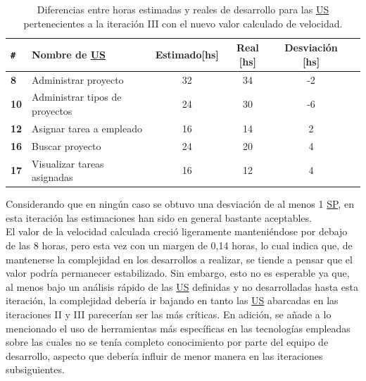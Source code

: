 \documentclass[a4paper, 12pt,twoside]{report}  %
\numberwithin{equation}{subsection} %
\begin{document}
\begin{table}[h!]
	\centering
	\captionsetup{justification=centering,margin=1.5cm}
	\begin{tabular}{ |p{0.5cm}|l|c|c|c|c| }
		\hline
		\verb|#|& \textbf{Nombre de \hyperlink{US}{US}}& \textbf{Estimado[hs]} & \textbf{Real [hs]} & \textbf{Desviación [hs]} \\
		\hline
		\textbf{8} & Administrar proyecto & 32 & 34 & \cellcolor{diferencia_estimacion_negativa}-2 \\
		\hline
		\textbf{10} & Administrar tipos de proyectos & 24 & 30 & \cellcolor{diferencia_estimacion_negativa}-6 \\
		\hline
		\textbf{12} & Asignar tarea a empleado & 16 & 14 & \cellcolor{diferencia_estimacion_positiva}2 \\
		\hline
		\textbf{16} & Buscar proyecto & 24 & 20 & \cellcolor{diferencia_estimacion_positiva}4 \\
		\hline
		\textbf{17} & Visualizar tareas asignadas & 16 & 12 & \cellcolor{diferencia_estimacion_positiva}4 \\
		\hline
	\end{tabular}
	\caption{Diferencias entre horas estimadas y reales de desarrollo para las \protect\hyperlink{US}{US} pertenecientes a la iteración III con el nuevo valor calculado de velocidad.}
	\label{tabla_dif_horas_estim_iter_3}
\end{table}

\indent Considerando que en ningún caso se obtuvo una desviación de al menos 1 \hyperlink{SP}{SP}, en esta iteración las estimaciones han sido en general bastante aceptables.\\
\indent El valor de la velocidad calculada creció ligeramente manteniéndose por debajo de las 8 horas, pero esta vez con un margen de 0,14 horas, lo cual indica que, de mantenerse la complejidad en los desarrollos a realizar, se tiende a pensar que el valor podría permanecer estabilizado. Sin embargo, esto no es esperable ya que, al menos bajo un análisis rápido de las \hyperlink{US}{US} definidas y no desarrolladas hasta esta iteración, la complejidad debería ir bajando en tanto las \hyperlink{US}{US} abarcadas en las iteraciones II y III parecerían ser las más críticas. En adición, se añade a lo mencionado el uso de herramientas más específicas en las tecnologías empleadas sobre las cuales no se tenía completo conocimiento por parte del equipo de desarrollo, aspecto que debería influir de menor manera en las iteraciones subsiguientes.
\end{document}
